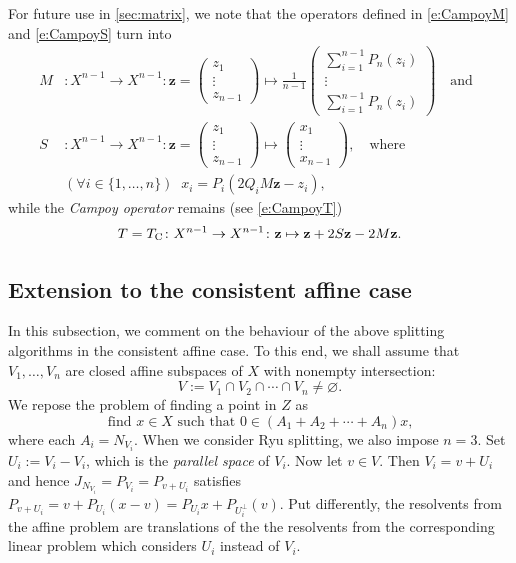 \documentclass[11pt]{article}
\newcommand{\bz}{\ensuremath{\mathbf{z}}}
\newcommand{\tc}{\ensuremath{T_{\text{\scriptsize C}}}}
\theoremstyle{definition}
\begin{document}
{For future use in \cref{sec:matrix}, we note that 
the operators defined in \cref{e:CampoyM} and \cref{e:CampoyS} 
 turn into
\begin{subequations}
\begin{align}
\label{e:CMlin}M
&: 
X^{n-1}\to X^{n-1} : 
\bz = 
\begin{pmatrix}
z_{1}\\
\vdots\\
z_{n-1}
\end{pmatrix}
\mapsto
\frac{1}{n-1}\begin{pmatrix}\sum_{i=1}^{n-1}P_{n}(z_{i})\\
\vdots\\
\sum_{i=1}^{n-1}P_{n}(z_{i})\end{pmatrix}
\quad\text{and}\;\;\\[+2mm]
\label{e:CSlin}
S&:X^{n-1}\to X^{n-1}:
\bz = \begin{pmatrix}
z_{1}\\
\vdots\\
z_{n-1}
\end{pmatrix}
\mapsto
\begin{pmatrix}
x_{1}\\
\vdots\\
x_{n-1}
\end{pmatrix},
\quad\text{where}\;\;
\\[+2mm]
&(\forall i\in\{1,\ldots,n\})
\;\;
x_{i} = P_{i}(2Q_iM\bz- z_{i}), 
\end{align}
\end{subequations}
while the \emph{Campoy operator} remains (see \cref{e:CampoyT}) 
 \begin{equation}
 \label{e:CTlin}
 T = \tc \colon X^{n-1}\to X^{n-1}\colon 
 \bz\mapsto 
 \bz+ 2S\bz - 2M\bz. 
 \end{equation}



\subsection{Extension to the consistent affine case} 


In this subsection, we comment on the behaviour of the above
splitting algorithms  in the consistent affine case.
To this end, we shall assume that 
$V_1,\ldots,V_n$ are closed affine subspaces of $X$ with
nonempty intersection:
\begin{equation*}
V := V_1\cap V_2\cap \cdots \cap V_n \neq \varnothing.
\end{equation*}
We repose the problem of finding a point in $Z$ as 
\begin{equation*}
\text{find $x\in X$ such that $0\in (A_1+A_2+\cdots+A_n)x$,}
\end{equation*}
where each $A_i = N_{V_i}$.
When we consider Ryu splitting, we also impose $n=3$.
Set $U_i:=V_i-V_i$, which is the \emph{parallel space} of $V_i$.
Now let $v\in V$.
Then $V_i = v+U_{i}$ and hence 
$J_{N_{V_i}}=P_{V_i} = P_{v+U_i}$ satisfies
$P_{v+U_i} = v+P_{U_i}(x-v)=P_{U_i}x+P_{U_i^\perp}(v)$.
Put differently, the resolvents from the affine problem
are translations of the the resolvents from the corresponding linear problem
which considers $U_i$ instead of $V_i$.

}
\end{document}
